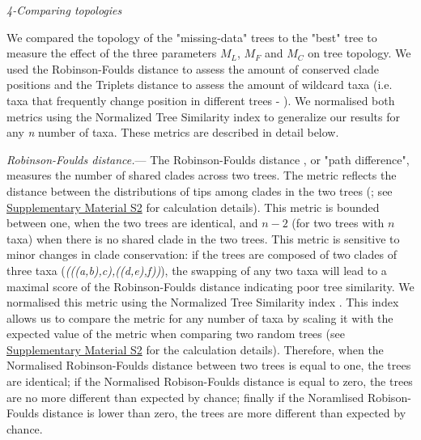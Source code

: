 \documentclass[12pt,letterpaper]{article}
\renewcommand{\subsection}[1]{%
\bigskip
\begin{center}
\begin{large}
\normalfont\itshape #1
\end{large}
\end{center}}
\renewcommand{\subsubsection}[1]{%
\vspace{2ex}
\noindent
\textit{#1.}---}
\begin{document}
\subsection{4-Comparing topologies}
We compared the topology of the "missing-data" trees to the "best" tree to measure the effect of the three parameters $M_{L}$, $M_{F}$ and $M_{C}$ on tree topology. We used the Robinson-Foulds distance \citep{RF1981} to assess the amount of conserved clade positions and the Triplets distance \citep{dobson1975triplets} to assess the amount of wildcard taxa  (i.e. taxa that frequently change position in different trees - \citealt{kearneyfragmentary2002}). We normalised both metrics using the Normalized Tree Similarity index \citep{Bogdanowicz2012} to generalize our results for any \textit{n} number of taxa. These metrics are described in detail below.

\subsubsection{Robinson-Foulds distance}
The Robinson-Foulds distance \citep{RF1981}, or "path difference", measures the number of shared clades across two trees. The metric reflects the distance between the distributions of tips among clades in the two trees (\citealt{RF1981}; see \hyperref[SupplementaryMaterial]{Supplementary Material S2} for calculation details). This metric is bounded between one, when the two trees are identical, and $n-2$ (for two trees with $n$ taxa) when there is no shared clade in the two trees. This metric is sensitive to minor changes in clade conservation: if the trees are composed of two clades of three taxa (\textit{(((a,b),c),((d,e),f))}), the swapping of any two taxa will lead to a maximal score of the Robinson-Foulds distance indicating poor tree similarity. We normalised this metric using the Normalized Tree Similarity index \citep{Bogdanowicz2012}. This index allows us to compare the metric for any number of taxa by scaling it with the expected value of the metric when comparing two random trees (see \hyperref[SupplementaryMaterial]{Supplementary Material S2} for the calculation details). Therefore, when the Normalised Robinson-Foulds distance between two trees is equal to one, the trees are identical; if the Normalised Robison-Foulds distance is equal to zero, the trees are no more different than expected by chance; finally if the Noramlised Robison-Foulds distance is lower than zero, the trees are more different than expected by chance.
\end{document}
